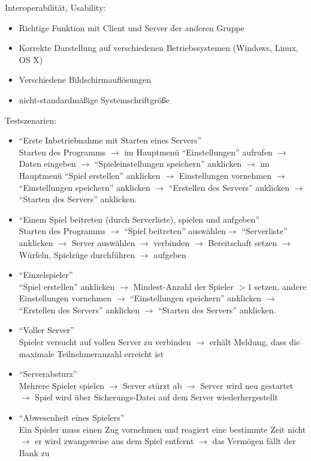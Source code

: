 \documentclass[a4paper,10pt]{article}
\begin{document}
\newpage
Interoperabilität, Usability:
\begin{itemize}
\item Richtige Funktion mit Client und Server der anderen Gruppe
\item Korrekte Darstellung auf verschiedenen Betriebssystemen (Windows, Linux, OS X)
\item Verschiedene Bildschirmauflösungen
\item nicht-standardmäßige Systemschriftgröße
\end{itemize}
Testszenarien:
\begin{itemize}
\item "`Erste Inbetriebnahme mit Starten eines Servers"' \\
Starten des Programms $\rightarrow$ im Hauptmenü "`Einstellungen"' aufrufen $\rightarrow$ Daten eingeben $\rightarrow$ "`Spieleinstellungen speichern"' anklicken $\rightarrow$ im Hauptmenü "`Spiel erstellen"' anklicken $\rightarrow$ Einstellungen vornehmen $\rightarrow$ "`Einstellungen speichern"' anklicken $\rightarrow$ "`Erstellen des Servers"' anklicken $\rightarrow$ "`Starten des Servers"' anklicken.
\item "`Einem Spiel beitreten (durch Serverliste), spielen und aufgeben"' \\
Starten des Programms $\rightarrow$ "`Spiel beitreten"' auswählen$\rightarrow$ "`Serverliste"' anklicken $\rightarrow$ Server auswählen $\rightarrow$ verbinden $\rightarrow$ Bereitschaft setzen $\rightarrow$ Würfeln, Spielzüge durchführen $\rightarrow$ aufgeben
\item "`Einzelspieler"' \\
"`Spiel erstellen"' anklicken $\rightarrow$ Mindest-Anzahl der Spieler $>1$ setzen, andere Einstellungen vornehmen $\rightarrow$ "`Einstellungen speichern"' anklicken $\rightarrow$ "`Erstellen des Servers"' anklicken $\rightarrow$ "`Starten des Servers"' anklicken.
\item "`Voller Server"' \\
Spieler versucht auf vollen Server zu verbinden $\rightarrow$ erhält Meldung, dass die maximale Teilnehmeranzahl erreicht ist
\item "`Serverabsturz"' \\
Mehrere Spieler spielen $\rightarrow$ Server stürzt ab $\rightarrow$ Server wird neu gestartet $\rightarrow$ Spiel wird über Sicherungs-Datei auf dem Server wiederhergestellt
\item "`Abwesenheit eines Spielers"' \\
Ein Spieler muss einen Zug vornehmen und reagiert eine bestimmte Zeit nicht $\rightarrow$ er wird zwangsweise aus dem Spiel entfernt $\rightarrow$ das Vermögen fällt der Bank zu
\end{itemize}
\end{document}
